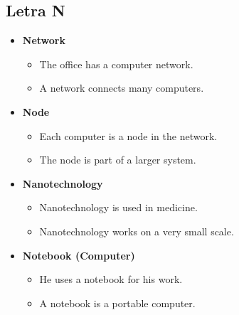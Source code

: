     \subsection{Letra N}
    \begin{itemize}
        \item \textbf{Network}
        \begin{itemize}
            \item The office has a computer network.
            \item A network connects many computers.
        \end{itemize}
        \item \textbf{Node}
        \begin{itemize}
            \item Each computer is a node in the network.
            \item The node is part of a larger system.
        \end{itemize}
        \item \textbf{Nanotechnology}
        \begin{itemize}
            \item Nanotechnology is used in medicine.
            \item Nanotechnology works on a very small scale.
        \end{itemize}
        \item \textbf{Notebook (Computer)}
        \begin{itemize}
            \item He uses a notebook for his work.
            \item A notebook is a portable computer.
        \end{itemize}
    \end{itemize}
